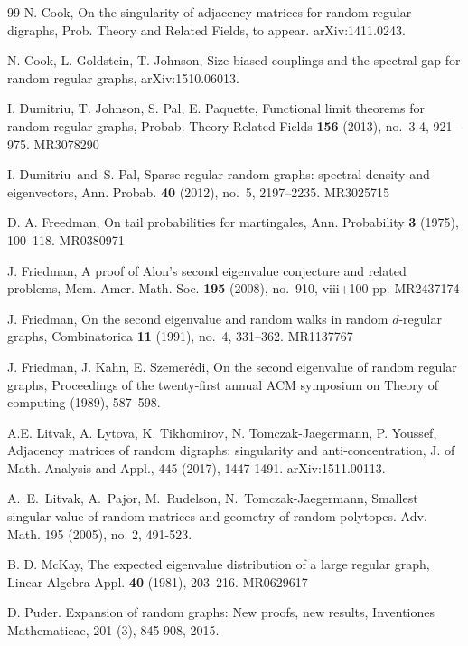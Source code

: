 \documentclass[12pt]{article}
\theoremstyle{definition}
\theoremstyle{plain}
\begin{document}
\begin{thebibliography}{99}
{
N. Cook, On the singularity of adjacency matrices for random regular digraphs, Prob. Theory and Related Fields,
to appear. arXiv:1411.0243.
}

{
N. Cook, L. Goldstein, T. Johnson,
Size biased couplings and the spectral gap for random regular graphs,
arXiv:1510.06013.
}

{
I. Dumitriu, T. Johnson, S. Pal, E. Paquette, Functional limit theorems for random regular graphs,
Probab. Theory Related Fields {\bf 156} (2013), no.~3-4, 921--975. MR3078290
}

{
I. Dumitriu\ and\ S. Pal, Sparse regular random graphs: spectral density and eigenvectors,
Ann. Probab. {\bf 40} (2012), no.~5, 2197--2235. MR3025715
}

{
D. A. Freedman, On tail probabilities for martingales, Ann. Probability {\bf 3} (1975), 100--118. MR0380971
}

{
J. Friedman, A proof of Alon's second eigenvalue conjecture and related problems,
Mem. Amer. Math. Soc. {\bf 195} (2008), no.~910, viii+100 pp. MR2437174
}

{
J. Friedman, On the second eigenvalue and random walks in random $d$-regular graphs,
Combinatorica {\bf 11} (1991), no.~4, 331--362. MR1137767
}

{
J. Friedman, J. Kahn, E. Szemer\'edi, 
On the second eigenvalue of random regular graphs,
Proceedings of the twenty-first annual ACM symposium on Theory of computing (1989), 587--598.
}



{
A.E. Litvak, A. Lytova, K. Tikhomirov, N. Tomczak-Jaegermann, P. Youssef,
Adjacency matrices of random digraphs: singularity and anti-concentration,  J. of Math. Analysis and Appl., 445 (2017), 1447-1491. arXiv:1511.00113.
}



{
A.~E.~Litvak, A.~Pajor, M.~Rudelson, N.~Tomczak-Jaegermann, Smallest singular value of random matrices and geometry of random polytopes. Adv. Math. 195 (2005), no. 2, 491-523.
}



{
B. D. McKay, The expected eigenvalue distribution of a large regular graph,
Linear Algebra Appl. {\bf 40} (1981), 203--216. MR0629617
}

{
D. Puder. Expansion of random graphs: New proofs, new results, Inventiones Mathematicae, 201 (3), 845-908, 2015.
}


\end{thebibliography}
\end{document}
